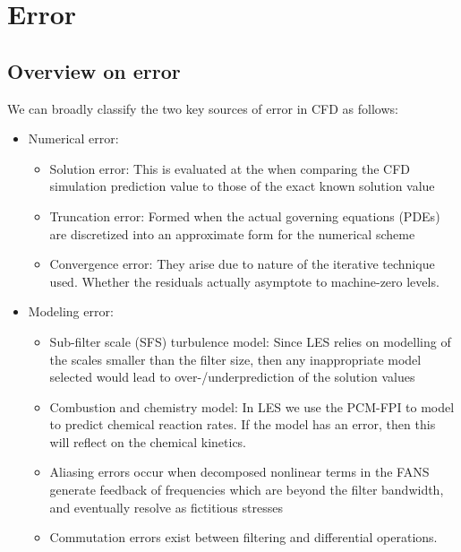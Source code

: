 \section{Error}

\subsection{Overview on error}
We can broadly classify the two key sources of error in CFD as follows:

\begin{itemize}
\item Numerical error:
	\begin{itemize}
	\item Solution error:
	This is evaluated at the when comparing the CFD simulation prediction value to those of the exact known solution value
	\item Truncation error:
	Formed when the actual governing equations (PDEs) are discretized into an approximate form for the numerical scheme
	\item Convergence error:
	They arise due to nature of the iterative technique used. Whether the residuals actually asymptote to machine-zero levels.
	\end{itemize}
\item Modeling error:
\begin{itemize}
	\item Sub-filter scale (SFS) turbulence model: 
		Since LES relies on modelling of the scales smaller than the filter size, then any inappropriate model selected would lead to over-/underprediction of the solution values
	\item Combustion and chemistry model:
		In LES we use the PCM-FPI to model to predict chemical reaction rates. If the model has an error, then this will reflect on the chemical kinetics.
    \item Aliasing errors occur when decomposed nonlinear terms in the FANS generate feedback of frequencies which are beyond the filter bandwidth, and eventually resolve as fictitious stresses
     \item Commutation errors exist between filtering and differential operations.
\end{itemize}
\end{itemize}
	
	
